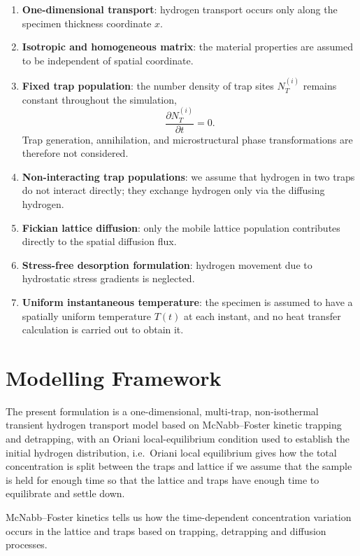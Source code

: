 \documentclass[a4paper,12pt,oneside]{report}
\begin{document}
\begin{enumerate}
    \item \textbf{One-dimensional transport}: hydrogen transport occurs only along the specimen thickness coordinate $x$.
    \item \textbf{Isotropic and homogeneous matrix}: the material properties are assumed to be independent of spatial coordinate.
    \item \textbf{Fixed trap population}: the number density of trap sites $N^{(i)}_T$ remains constant throughout the simulation,
    \begin{equation}
    \frac{\partial N^{(i)}_T}{\partial t} = 0.
    \label{eq:ch3_NT_const}
    \end{equation}
    Trap generation, annihilation, and microstructural phase transformations are therefore not considered.
    \item \textbf{Non-interacting trap populations}: we assume that hydrogen in two traps do not interact directly; they exchange hydrogen only via the diffusing hydrogen.
    \item \textbf{Fickian lattice diffusion}: only the mobile lattice population contributes directly to the spatial diffusion flux.
    \item \textbf{Stress-free desorption formulation}: hydrogen movement due to hydrostatic stress gradients is neglected.
    \item \textbf{Uniform instantaneous temperature}: the specimen is assumed to have a spatially uniform temperature $T(t)$ at each instant, and no heat transfer calculation is carried out to obtain it.
\end{enumerate}

\section{Modelling Framework}

The present formulation is a one-dimensional, multi-trap, non-isothermal transient hydrogen transport model based on McNabb--Foster kinetic trapping and detrapping, with an Oriani local-equilibrium condition used to establish the initial hydrogen distribution, i.e.\ Oriani local equilibrium gives how the total concentration is split between the traps and lattice if we assume that the sample is held for enough time so that the lattice and traps have enough time to equilibrate and settle down.

McNabb--Foster kinetics tells us how the time-dependent concentration variation occurs in the lattice and traps based on trapping, detrapping and diffusion processes.
\end{document}
